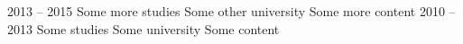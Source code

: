 \documentclass[9pt]{developercv} %
\begin{document}
                \begin{entrylist}
                    \entry
	{2013 -- 2015}
	{Some more studies}
	{Some other university}
	{Some more content}
\entry
	{2010 -- 2013}
	{Some studies}
	{Some university}
	{Some content}
                \end{entrylist}
                
                
                            \begin{minipage}[t]{1.0\textwidth}
                \vspace{-\baselineskip} %
                	                \begin{barchart}{3.0}
                \end{barchart}
            \end{minipage}

                
\end{document}
